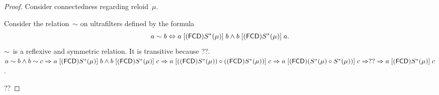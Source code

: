 \begin{proof}

Consider connectedness regarding reloid~$\mu$.

Consider the relation~$\sim$ on ultrafilters defined by the formula
\[ a\sim b\Leftrightarrow a\mathrel{\left[(\mathsf{FCD}) S^\ast(\mu)\right]}b \land
b\mathrel{\left[(\mathsf{FCD}) S^\ast(\mu)\right]}a. \]
$\sim$~is a reflexive and symmetric relation.
It is transitive because ??.
$a\sim b\land b\sim c \Rightarrow
a\mathrel{\left[(\mathsf{FCD}) S^\ast(\mu)\right]}b \land b\mathrel{\left[(\mathsf{FCD}) S^\ast(\mu)\right]}c
\Rightarrow
a\mathrel{\left[((\mathsf{FCD}) S^\ast(\mu))\circ((\mathsf{FCD}) S^\ast(\mu))\right]}c
\Rightarrow
a\mathrel{\left[(\mathsf{FCD})(S^\ast(\mu)\circ S^\ast(\mu))\right]}c
\Rightarrow??\Rightarrow
a\mathrel{\left[(\mathsf{FCD}) S^\ast(\mu)\right]}c$.

??
\end{proof}

